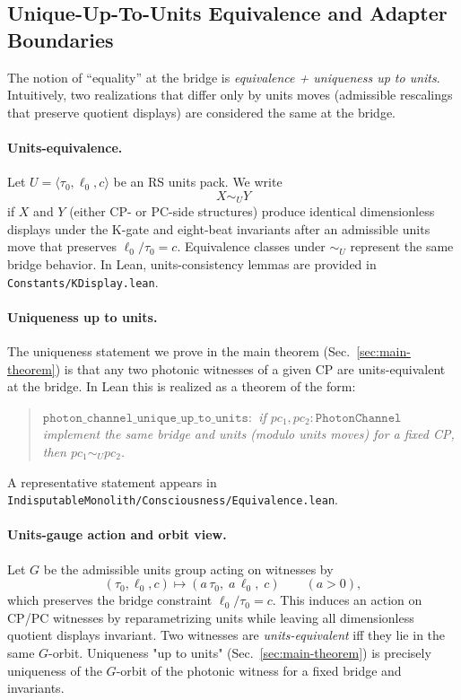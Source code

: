 \documentclass[12pt,a4paper]{article}
\begin{document}
\subsection{Unique-Up-To-Units Equivalence and Adapter Boundaries}
\label{subsec:units-equivalence}
The notion of ``equality'' at the bridge is \emph{equivalence + uniqueness up to units}. Intuitively, two realizations that differ only by units moves (admissible rescalings that preserve quotient displays) are considered the same at the bridge.

\paragraph{Units-equivalence.}
Let \(U=\langle \tau_0,\ell_0,c\rangle\) be an RS units pack. We write
\[
  X \sim_U Y
\]
if \(X\) and \(Y\) (either CP- or PC-side structures) produce identical dimensionless displays under the K-gate and eight-beat invariants after an admissible units move that preserves \(\ell_0/\tau_0=c\). Equivalence classes under \(\sim_U\) represent the same bridge behavior. In Lean, units-consistency lemmas are provided in \texttt{Constants/KDisplay.lean}.

\paragraph{Uniqueness up to units.}
The uniqueness statement we prove in the main theorem (Sec.~\ref{sec:main-theorem}) is that any two photonic witnesses of a given CP are units-equivalent at the bridge. In Lean this is realized as a theorem of the form:
\begin{quote}\itshape
\(\texttt{photon\_channel\_unique\_up\_to\_units} :\) if \(pc_1, pc_2:\texttt{PhotonChannel}\) implement the same bridge and units (modulo units moves) for a fixed CP, then \(pc_1 \sim_U pc_2\).
\end{quote}
A representative statement appears in \texttt{IndisputableMonolith/Consciousness/Equivalence.lean}.

\paragraph{Units-gauge action and orbit view.}
Let \(G\) be the admissible units group acting on witnesses by
\[
  (\tau_0,\ell_0,c) \mapsto (a\,\tau_0,\; a\,\ell_0,\; c)
  \qquad (a>0),
\]
which preserves the bridge constraint \(\ell_0/\tau_0=c\). This induces an action on CP/PC witnesses by reparametrizing units while leaving all dimensionless quotient displays invariant. Two witnesses are \emph{units-equivalent} iff they lie in the same \(G\)-orbit. Uniqueness "up to units" (Sec.~\ref{sec:main-theorem}) is precisely uniqueness of the \(G\)-orbit of the photonic witness for a fixed bridge and invariants.
\end{document}
